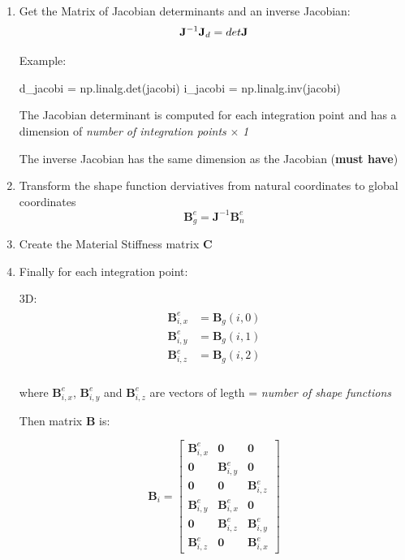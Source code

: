 \documentclass[10pt,b5paper,titlepage]{book}
\newcommand{\m}{\mathbf}
\newenvironment{eqarray}
{
    \begin{eqnarray}
        \begin{aligned}
}
{
        \end{aligned}
    \end{eqnarray}
}
\begin{document}
\begin{enumerate}
    \item Get the Matrix of Jacobian determinants and an inverse Jacobian:
        \begin{equation}
            \m{J}^{-1}\\
            \m{J}_d = det \m{J}
        \end{equation}

        Example:
        \begin{python}
d_jacobi = np.linalg.det(jacobi)
i_jacobi = np.linalg.inv(jacobi)
        \end{python}

        The Jacobian determinant is computed for each integration point and has a dimension
        of \textit{number of integration points} $\times$ \textit{1}

        The inverse Jacobian has the same dimension as the Jacobian (\textbf{must have})

    \item Transform the shape function derviatives from natural coordinates to
        global coordinates
        \begin{equation}
            \m{B}_g^e = \m{J}^{-1} \m{B}_n^e
        \end{equation}

    \item Create the Material Stiffness matrix $ \m{C} $

    \item Finally for each integration point:

        3D:
        \begin{eqarray}
            \m{B}_{i,x}^e &= \m{B}_g(i, 0) \\
            \m{B}_{i,y}^e &= \m{B}_g(i, 1) \\
            \m{B}_{i,z}^e &= \m{B}_g(i, 2)\\
        \end{eqarray}

        where $ \m{B}_{i,x}^e $,  $ \m{B}_{i,y}^e $ and  $ \m{B}_{i,z}^e $
        are vectors of legth = \textit{number of shape functions}

        Then matrix $ \m{B} $ is:

        \begin{equation}
            \m{B}_i = \begin{bmatrix}
                \m{B}_{i,x}^e & \m{0} & \m{0}\\
                \m{0} & \m{B}_{i,y}^e & \m{0}\\
                \m{0} & \m{0} & \m{B}_{i,z}^e \\
                \m{B}_{i,y}^e & \m{B}_{i,x}^e & \m{0}\\
                \m{0} & \m{B}_{i,z}^e & \m{B}_{i,y}^e \\
                \m{B}_{i,z}^e & \m{0} & \m{B}_{i,x}^e
            \end{bmatrix}
        \end{equation}


\end{enumerate}
\end{document}
